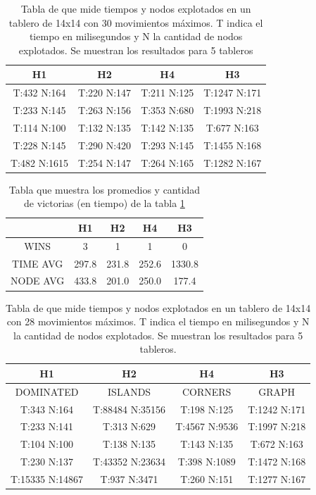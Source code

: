 \documentclass{article}
\begin{document}
\begin{table}
  \begin{tabular}{|c|c|c|c|}
  
  \hline
  H1 & H2 & H4 & H3 \\
  \hline
T:432 N:164 & T:220 N:147 & T:211 N:125 & T:1247 N:171 \\
\hline
T:233 N:145 & T:263 N:156 & T:353 N:680 & T:1993 N:218 \\
\hline
T:114 N:100 & T:132 N:135 & T:142 N:135 & T:677 N:163 \\
\hline
T:228 N:145 & T:290 N:420 & T:293 N:145 & T:1455 N:168 \\
\hline
T:482 N:1615 & T:254 N:147 & T:264 N:165 & T:1282 N:167 \\
\hline
  \end{tabular}
  \centering
  \caption{Tabla de que mide tiempos y nodos explotados en un tablero de 14x14 con 30 movimientos m\'aximos. T indica el tiempo en milisegundos y N la cantidad de nodos explotados. Se muestran los resultados para 5 tableros}
  \label{tablaHeuristicas}
\end{table}

\begin{table}
  \begin{tabular}{|c|c|c|c|c|}
\hline
& H1 & H2 & H4 & H3 \\
\hline
WINS & 3 & 1 & 1 & 0 \\
\hline
TIME AVG & 297.8 & 231.8 & 252.6 & 1330.8 \\
\hline
NODE AVG & 433.8 & 201.0 & 250.0 & 177.4 \\  
\hline
\end{tabular}
\centering
	\caption{Tabla que muestra los promedios y cantidad de victorias (en tiempo) de la tabla \ref{tablaHeuristicas}}
    \label{promedios1}
  
\end{table}


\begin{table}
  \begin{tabular}{|c|c|c|c|}
  \hline
  H1 & H2 & H4 & H3 \\
  \hline
DOMINATED & ISLANDS & CORNERS & GRAPH \\
\hline
T:343 N:164 & T:88484 N:35156 & T:198 N:125 & T:1242 N:171 \\
\hline
T:233 N:141 & T:313 N:629 & T:4567 N:9536 & T:1997 N:218 \\
\hline
T:104 N:100 & T:138 N:135 & T:143 N:135 & T:672 N:163 \\
\hline
T:230 N:137 & T:43352 N:23634 & T:398 N:1089 & T:1472 N:168 \\
\hline
T:15335 N:14867 & T:937 N:3471 & T:260 N:151 & T:1277 N:167 \\
\hline
  \end{tabular}
  \centering
  \caption{Tabla de que mide tiempos y nodos explotados en un tablero de 14x14 con 28 movimientos m\'aximos. T indica el tiempo en milisegundos y N la cantidad de nodos explotados. Se muestran los resultados para 5 tableros.}
  \label{tablaHeuristicas2}
\end{table}
\end{document}
